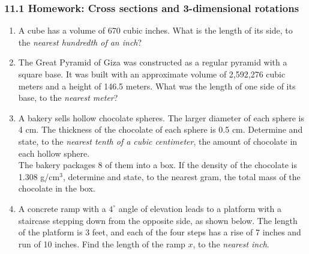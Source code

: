 \documentclass[12pt, twoside]{article}
\begin{document}
\subsubsection*{11.1 Homework: Cross sections and 3-dimensional rotations}
 \begin{enumerate}
  \item A cube has a volume of 670 cubic inches. What is the length of its side, to the \emph{nearest hundredth of an inch}? \vspace{3cm}

  \item The Great Pyramid of Giza was constructed as a regular pyramid with a square base. It was built with an approximate volume of 2,592,276 cubic meters and a height of 146.5 meters. What was the length of one side of its base, to the \emph{nearest meter}? \vspace{5cm}

  \item A bakery sells hollow chocolate spheres. The larger diameter of each sphere is 4 cm. The thickness of the chocolate of each sphere is 0.5 cm. Determine and state, to the \emph{nearest tenth of a cubic centimeter}, the amount of chocolate in each hollow sphere.\\[4.5cm]
  The bakery packages 8 of them into a box. If the density of the chocolate is 1.308 g/$\mathrm{cm}^3$, determine and state, to the nearest gram, the total mass of the chocolate in the box.

\newpage
\item A concrete ramp with a $4^\circ$ angle of elevation leads to a platform with a staircase stepping down from the opposite side, as shown below. The length of the platform is 3 feet, and each of the four steps has a rise of 7 inches and run of 10 inches. Find the length of the ramp $x$, to the \emph{nearest inch}.\\[0.25cm]
       \vspace{5cm}


\end{enumerate}
\end{document}
